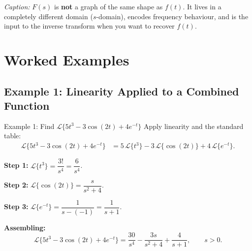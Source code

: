 \documentclass[12pt,a4paper]{article}
\begin{document}
\begin{center}
\hfill
{}
\end{center}

\textit{Caption:} $F(s)$ is \textbf{not} a graph of the same shape as $f(t)$. It lives in a completely different domain ($s$-domain), encodes frequency behaviour, and is the input to the inverse transform when you want to recover $f(t)$.

\section{Worked Examples}

\subsection{Example 1: Linearity Applied to a Combined Function}

\begin{infobox}{Example 1: Find $\mathcal{L}\{5t^3 - 3\cos(2t) + 4e^{-t}\}$}
Apply linearity and the standard table:
\begin{align*}
\mathcal{L}\{5t^3 - 3\cos(2t) + 4e^{-t}\}
  &= 5\,\mathcal{L}\{t^3\} - 3\,\mathcal{L}\{\cos(2t)\} + 4\,\mathcal{L}\{e^{-t}\}.
\end{align*}

\textbf{Step 1:} $\mathcal{L}\{t^3\} = \dfrac{3!}{s^4} = \dfrac{6}{s^4}$.

\textbf{Step 2:} $\mathcal{L}\{\cos(2t)\} = \dfrac{s}{s^2 + 4}$.

\textbf{Step 3:} $\mathcal{L}\{e^{-t}\} = \dfrac{1}{s-(-1)} = \dfrac{1}{s+1}$.

\textbf{Assembling:}
\[
\mathcal{L}\{5t^3 - 3\cos(2t) + 4e^{-t}\}
  = \frac{30}{s^4} - \frac{3s}{s^2+4} + \frac{4}{s+1}, \qquad s > 0.
\]
\end{infobox}
\end{document}
